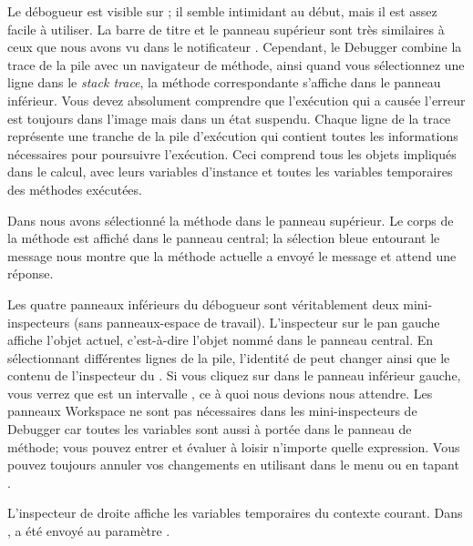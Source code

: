 \documentclass[a4paper,10pt,twoside]{book}
\begin{document}
Le d\'ebogueur est visible sur ; 
il semble intimidant au d\'ebut, mais il est assez facile \`a utiliser.
La barre de titre et le panneau sup\'erieur sont tr\`es similaires
\`a ceux que nous avons vu dans le notificateur .
Cependant, le Debugger combine la trace de la pile avec un navigateur de
m\'ethode, ainsi quand vous s\'electionnez une ligne dans le \emph{stack
trace}, la m\'ethode correspondante s'affiche dans le panneau inf\'erieur.
Vous devez absolument comprendre que l'ex\'ecution qui a caus\'ee l'erreur
est toujours dans l'image mais dans un \'etat suspendu.
Chaque ligne de la trace repr\'esente une tranche de la pile
d'ex\'ecution qui contient toutes les informations n\'ecessaires
pour poursuivre l'ex\'ecution. Ceci comprend tous les objets impliqu\'es
dans le calcul, avec leurs variables d'instance et toutes les variables
temporaires des m\'ethodes ex\'ecut\'ees.

Dans  nous avons s\'electionn\'e
la m\'ethode  dans le panneau sup\'erieur.
Le corps de la m\'ethode est affich\'e dans le panneau central;
la s\'election bleue entourant le message  nous montre
que la m\'ethode actuelle a envoy\'e le message  et
attend une r\'eponse.

Les quatre panneaux inf\'erieurs du d\'ebogueur sont v\'eritablement deux
mini-inspecteurs (sans panneaux-espace de travail).
L'inspecteur sur le pan gauche affiche l'objet actuel,
c'est-à-dire l'objet nomm\'e \self dans le panneau central.
En s\'electionnant diff\'erentes lignes de la pile, l'identit\'e de \self
peut changer ainsi que le contenu de
l'inspecteur du \self{}.
Si vous cliquez sur \self dans le panneau inf\'erieur gauche, vous verrez
que \self est un intervalle , ce \`a quoi nous devions
nous attendre.
Les panneaux Workspace ne sont pas n\'ecessaires dans les mini-inspecteurs
de Debugger car toutes les variables sont aussi \`a port\'ee dans
le panneau de m\'ethode; vous pouvez entrer et \'evaluer \`a loisir 
n'importe quelle expression.
Vous pouvez toujours annuler vos changements en utilisant 
 dans le menu ou en tapant . 

L'inspecteur de droite affiche les variables temporaires du contexte courant.
Dans ,
 a \'et\'e envoy\'e au param\`etre .
\end{document}

